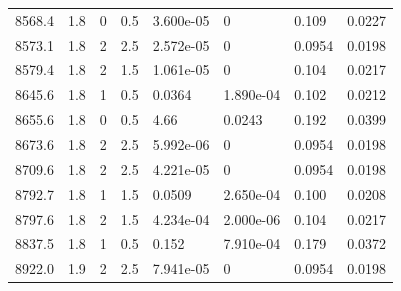 \documentclass[preview]{standalone}
\begin{document}
{{{{\begin{tabular}{L{1.2cm}C{1.2cm} C{0.3cm}C{0.5cm} C{1.4cm}C{1.4cm} C{1.4cm}C{1.4cm}}
  8568.4  &   1.8  & 0     & 0.5 &  3.600e-05  & 0  & 0.109 &  0.0227   \\ 
  8573.1  &   1.8  & 2     & 2.5 &  2.572e-05  & 0  & 0.0954 &  0.0198   \\ 
  8579.4  &   1.8  & 2     & 1.5 &  1.061e-05  & 0  & 0.104 &  0.0217   \\ 
  8645.6  &   1.8  & 1     & 0.5 &  0.0364  & 1.890e-04  & 0.102 &  0.0212   \\ 
  8655.6  &   1.8  & 0     & 0.5 &  4.66  & 0.0243  & 0.192 &  0.0399   \\ 
  8673.6  &   1.8  & 2     & 2.5 &  5.992e-06  & 0  & 0.0954 &  0.0198   \\ 
  8709.6  &   1.8  & 2     & 2.5 &  4.221e-05  & 0  & 0.0954 &  0.0198   \\ 
  8792.7  &   1.8  & 1     & 1.5 &  0.0509  & 2.650e-04  & 0.100 &  0.0208   \\ 
  8797.6  &   1.8  & 2     & 1.5 &  4.234e-04  & 2.000e-06  & 0.104 &  0.0217   \\ 
  8837.5  &   1.8  & 1     & 0.5 &  0.152  & 7.910e-04  & 0.179 &  0.0372   \\ 
  8922.0  &   1.9  & 2     & 2.5 &  7.941e-05  & 0  & 0.0954 &  0.0198   \\ 
\hline 
\end{tabular} 

}}}}
\end{document}
